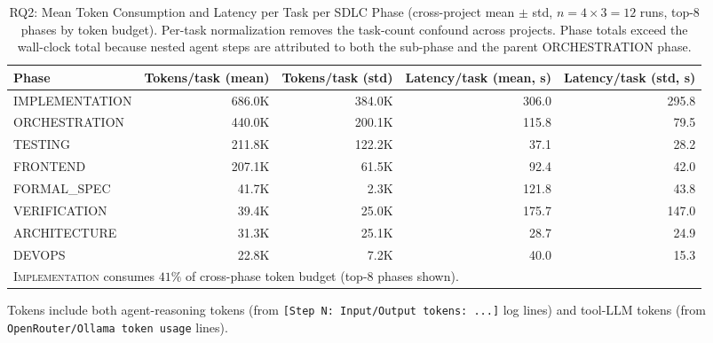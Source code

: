 \begin{table}[t]
\centering
\caption{RQ2: Mean Token Consumption and Latency per Task per SDLC Phase (cross-project mean $\pm$ std, $n = 4 \times 3 = 12$ runs, top-8 phases by token budget). Per-task normalization removes the task-count confound across projects. Phase totals exceed the wall-clock total because nested agent steps are attributed to both the sub-phase and the parent ORCHESTRATION phase.}
\label{tab:rq2_cost}
\renewcommand{\arraystretch}{1.15}
\begin{tabular}{@{}lrrrr@{}}
\toprule
\textbf{Phase} & \textbf{Tokens/task (mean)} & \textbf{Tokens/task (std)} & \textbf{Latency/task (mean, s)} & \textbf{Latency/task (std, s)} \\
\midrule
\rowcolor[HTML]{FEF7E0} IMPLEMENTATION & 686.0K & 384.0K & 306.0 & 295.8 \\
ORCHESTRATION & 440.0K & 200.1K & 115.8 & 79.5 \\
TESTING & 211.8K & 122.2K & 37.1 & 28.2 \\
FRONTEND & 207.1K & 61.5K & 92.4 & 42.0 \\
FORMAL\_SPEC & 41.7K & 2.3K & 121.8 & 43.8 \\
VERIFICATION & 39.4K & 25.0K & 175.7 & 147.0 \\
ARCHITECTURE & 31.3K & 25.1K & 28.7 & 24.9 \\
DEVOPS & 22.8K & 7.2K & 40.0 & 15.3 \\
\midrule
\multicolumn{5}{l}{\footnotesize \textsc{Implementation} consumes $41\%$ of cross-phase token budget (top-8 phases shown).} \\
\bottomrule
\end{tabular}
\footnotesize Tokens include both agent-reasoning tokens (from \texttt{[Step N: Input/Output tokens: ...]} log lines) and tool-LLM tokens (from \texttt{OpenRouter/Ollama token usage} lines).
\end{table}
